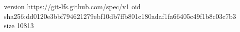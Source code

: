 version https://git-lfs.github.com/spec/v1
oid sha256:dd0120e3bbf794621279ebf10db7ffb801c180adaf1fa66405c49f1b8c03c7b3
size 10813
